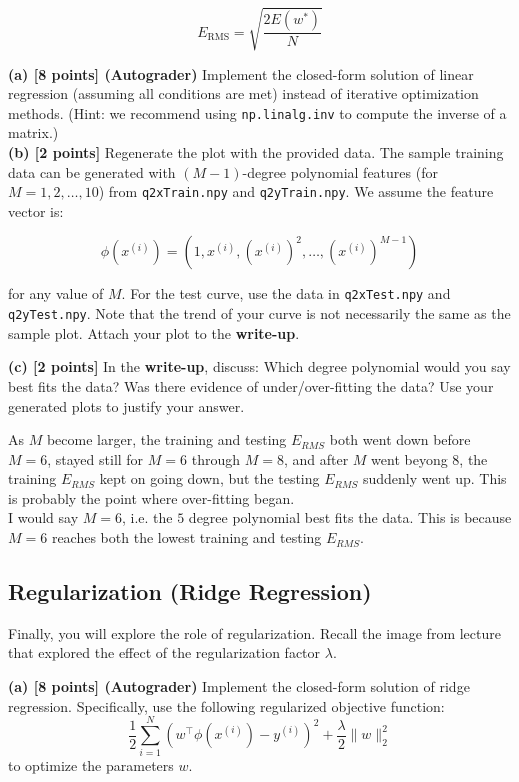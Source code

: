 \documentclass[lang=cn,11pt]{elegantbook}
\begin{document}
\[
E_{\text{RMS}} = \sqrt{\frac{2E(w^*)}{N}}
\]


\noindent \textbf{(a) [8 points] (Autograder)} Implement the closed-form solution of linear regression (assuming all conditions are met) instead of iterative optimization methods. (Hint: we recommend using \texttt{np.linalg.inv} to compute the inverse of a matrix.)\\
\textbf{(b) [2 points]} Regenerate the plot with the provided data. The sample training data can be generated with \((M - 1)\)-degree polynomial features (for \( M = 1, 2, \dots, 10 \)) from \texttt{q2xTrain.npy} and \texttt{q2yTrain.npy}. We assume the feature vector is:

\[
\phi(x^{(i)}) = (1, x^{(i)}, (x^{(i)})^2, \dots, (x^{(i)})^{M-1})
\]

for any value of \( M \). For the test curve, use the data in \texttt{q2xTest.npy} and \texttt{q2yTest.npy}. Note that the trend of your curve is not necessarily the same as the sample plot. Attach your plot to the \textbf{write-up}.
\begin{solution}
\end{solution}


\textbf{(c) [2 points]} In the \textbf{write-up}, discuss: Which degree polynomial would you say best fits the data? Was there evidence of under/over-fitting the data? Use your generated plots to justify your answer.
\begin{solution}
As $M$ become larger, the training and testing $E_{RMS}$ both went down before $M = 6$, stayed still for $M=6$ through $M=8$, and after $M$ went beyong $8$, the training $E_{RMS}$ kept on going down, but the testing $E_{RMS}$ suddenly went up. This is probably the point where over-fitting began.\\
    I would say $M=6$, i.e. the $5$ degree polynomial best fits the data. This is because $M=6$ reaches both the lowest training and testing $E_{RMS}$.
\end{solution}


\subsection{Regularization (Ridge Regression)}
Finally, you will explore the role of regularization. Recall the image from lecture that explored the effect of the regularization factor \( \lambda \).

\textbf{(a) [8 points] (Autograder)} Implement the closed-form solution of ridge regression. Specifically, use the following regularized objective function:
\[
\frac{1}{2} \sum_{i=1}^N (w^\top \phi(x^{(i)}) - y^{(i)})^2 + \frac{\lambda}{2} \|w\|_2^2
\]
to optimize the parameters \( w \).\\
\end{document}
